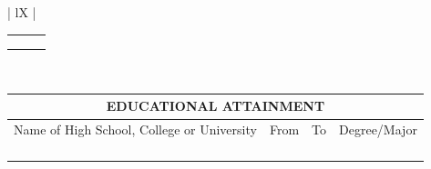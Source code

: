 \documentclass{article}
\begin{document}
\begin{Form}
\begin{center}
\begin{tabularx}{\textwidth}{ | lX | }
{\begin{tabularx}{\textwidth}{ | X | X | X | }
						\TextField[name=Empl2,width=\linewidth]{} & \TextField[name=Pos2,width=\linewidth]{} & \TextField[name=EmplDate2,width=\linewidth]{}\\
						\TextField[name=Empl3,width=\linewidth]{} & \TextField[name=Pos3,width=\linewidth]{} & \TextField[name=EmplDate3,width=\linewidth]{}\\
						\TextField[name=Empl4,width=\linewidth]{} & \TextField[name=Pos4,width=\linewidth]{} & \TextField[name=EmplDate4,width=\linewidth]{}\\
						\hline
					\end{tabularx}
				}\\
				\hline
			\end{tabularx}
		\end{center}

		\begin{center}
			\begin{tabularx}{\textwidth}{ | X  X  X  X | }
				\hline
				\multicolumn{4}{|c|}{EDUCATIONAL ATTAINMENT}\\
				\hline
				\multicolumn{1}{|X}{Name of High School, College or University} & \multicolumn{1}{c}{From} & \multicolumn{1}{c}{To} & \multicolumn{1}{c|}{Degree/Major}\\
				\TextField[name=SchoolName1,width=\linewidth]{} & \TextField[name=StartDate1,width=\linewidth]{} & \TextField[name=EndDate1,width=\linewidth]{} & \TextField[name=Degree1,width=\linewidth]{}\\
				\TextField[name=SchoolName2,width=\linewidth]{} & \TextField[name=StartDate2,width=\linewidth]{} & \TextField[name=EndDate2,width=\linewidth]{} & \TextField[name=Degree2,width=\linewidth]{}\\
				\TextField[name=SchoolName3,width=\linewidth]{} & \TextField[name=StartDate3,width=\linewidth]{} & \TextField[name=EndDate3,width=\linewidth]{} & \TextField[name=Degree3,width=\linewidth]{}\\
				\TextField[name=SchoolName4,width=\linewidth]{} & \TextField[name=StartDate4,width=\linewidth]{} & \TextField[name=EndDate4,width=\linewidth]{} & \TextField[name=Degree4,width=\linewidth]{}\\
				\hline
			\end{tabularx}
		\end{center}


\end{Form}
\end{document}
